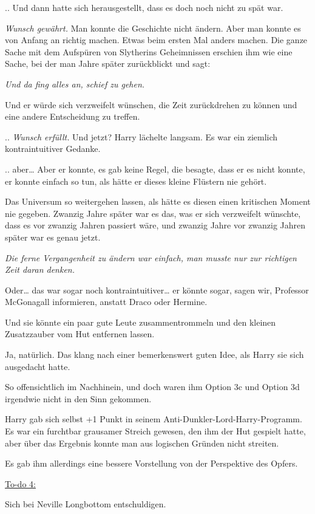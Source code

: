 {.. Und dann hatte sich herausgestellt, dass es doch noch nicht zu spät war.

\emph{Wunsch gewährt.} Man konnte die Geschichte nicht ändern. Aber man konnte es von Anfang an richtig machen. Etwas beim ersten Mal anders machen. Die ganze Sache mit dem Aufspüren von Slytherins Geheimnissen erschien ihm wie eine Sache, bei der man Jahre später zurückblickt und sagt:

\emph{Und da fing alles an, schief zu gehen.}

Und er würde sich verzweifelt wünschen, die Zeit zurückdrehen zu können und eine andere Entscheidung zu treffen.

.. \emph{Wunsch erfüllt.} Und jetzt? Harry lächelte langsam. Es war ein ziemlich kontraintuitiver Gedanke.

.. aber… Aber er konnte, es gab keine Regel, die besagte, dass er es nicht konnte, er konnte einfach so tun, als hätte er dieses kleine Flüstern nie gehört.

Das Universum so weitergehen lassen, als hätte es diesen einen kritischen Moment nie gegeben. Zwanzig Jahre später war es das, was er sich verzweifelt wünschte, dass es vor zwanzig Jahren passiert wäre, und zwanzig Jahre vor zwanzig Jahren später war es genau jetzt.

\emph{Die ferne Vergangenheit zu ändern war einfach, man musste nur zur richtigen Zeit daran denken.}

Oder… das war sogar noch kontraintuitiver… er könnte sogar, sagen wir, Professor McGonagall informieren, anstatt Draco oder Hermine.

Und sie könnte ein paar gute Leute zusammentrommeln und den kleinen Zusatzzauber vom Hut entfernen lassen.

Ja, natürlich. Das klang nach einer bemerkenswert guten Idee, als Harry sie sich ausgedacht hatte.

So offensichtlich im Nachhinein, und doch waren ihm Option 3c und Option 3d irgendwie nicht in den Sinn gekommen.

Harry gab sich selbst +1 Punkt in seinem Anti-Dunkler-Lord-Harry-Programm. Es war ein furchtbar grausamer Streich gewesen, den ihm der Hut gespielt hatte, aber über das Ergebnis konnte man aus logischen Gründen nicht streiten.

Es gab ihm allerdings eine bessere Vorstellung von der Perspektive des Opfers.

\uline{To-do 4:}

Sich bei Neville Longbottom entschuldigen.

}
